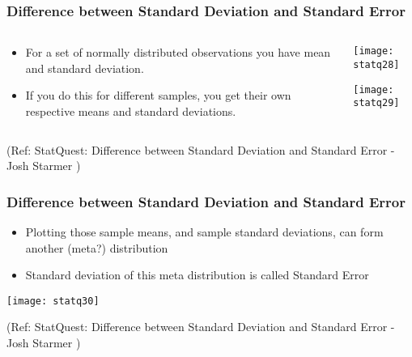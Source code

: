 %
\begin{frame}[fragile]\frametitle{Difference between Standard Deviation and Standard Error}
\begin{columns}
    \begin{column}[T]{0.6\linewidth}
	\begin{itemize}
	\item For a set of normally distributed observations you have mean and standard deviation.
	\item If you do this for different samples, you get their own respective means and standard deviations.
	\end{itemize}

    \end{column}
    \begin{column}[T]{0.4\linewidth}
      \begin{center}
      \texttt{[image: statq28]}
	  
	  \texttt{[image: statq29]}
	   
	  	\end{center}
    \end{column}

  \end{columns}
  
\tiny{(Ref: StatQuest: Difference between Standard Deviation and Standard Error - Josh Starmer )}
\end{frame}

\begin{frame}[fragile]\frametitle{Difference between Standard Deviation and Standard Error}

	\begin{itemize}
	\item Plotting those sample means, and sample standard deviations, can form another (meta?) distribution
	\item Standard deviation of this meta distribution is called Standard Error
	\end{itemize}

      \begin{center}
      \texttt{[image: statq30]}
	\end{center}

  
\tiny{(Ref: StatQuest: Difference between Standard Deviation and Standard Error - Josh Starmer )}
\end{frame}
